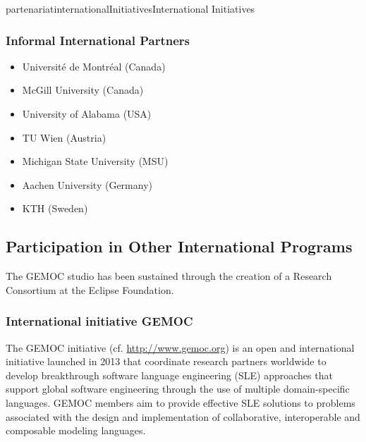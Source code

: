 \documentclass{ra2018}
\begin{document}
\begin{module}{partenariat}{internationalInitiatives}{International Initiatives}
%




        \subsubsection{Informal International Partners}
        

\begin{itemize}
\item Université de Montréal (Canada)
\item McGill University (Canada)
\item University of Alabama (USA)
\item TU Wien (Austria)
\item Michigan State University (MSU)
\item Aachen University (Germany)
\item KTH (Sweden)
\end{itemize}

\subsection{Participation in Other International Programs}

The GEMOC studio has been sustained through the creation of a Research Consortium at the Eclipse Foundation.

\subsubsection{International initiative GEMOC}
The GEMOC initiative (cf. \url{http://www.gemoc.org}) is an open and international initiative launched in 2013 that coordinate research partners worldwide to develop breakthrough software language engineering (SLE) approaches that support global software engineering through the use of multiple domain-specific languages. GEMOC members aim to provide effective SLE solutions to problems associated with the design and implementation of collaborative, interoperable and composable modeling languages.


\end{module}
\end{document}
